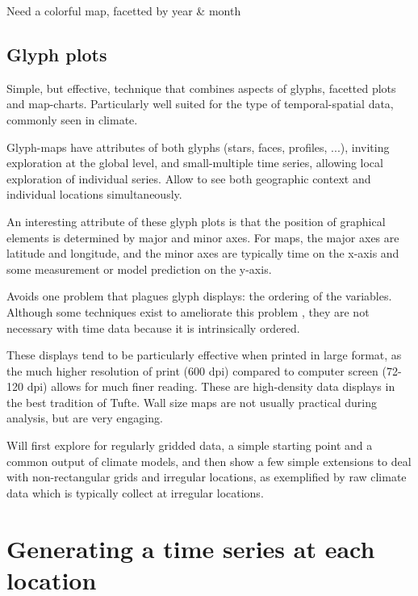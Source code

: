 \documentclass[oneside]{article}
\begin{document}
Need a colorful map, facetted by year \& month


\subsection{Glyph plots}

Simple, but effective, technique that combines aspects of glyphs, facetted plots and map-charts. Particularly well suited for the type of temporal-spatial data, commonly seen in climate.

Glyph-maps have attributes of both glyphs (stars, faces, profiles, ...), inviting exploration at the global level, and small-multiple time series, allowing local exploration of individual series. Allow to see both geographic context and individual locations simultaneously.

An interesting attribute of these glyph plots is that the position of graphical elements is determined by major and minor axes. For maps, the major axes are latitude and longitude, and the minor axes are typically time on the x-axis and some measurement or model prediction on the y-axis.

Avoids one problem that plagues glyph displays: the ordering of the variables. Although some techniques exist to ameliorate this problem \citep{kleiner:1981,hurley:2010}, they are not necessary with time data because it is intrinsically ordered.

These displays tend to be particularly effective when printed in large format, as the much higher resolution of print (600 dpi) compared to computer  screen (72-120 dpi) allows for much finer reading. These are high-density data displays in the best tradition of Tufte. Wall size maps are not usually practical during analysis, but are very engaging.

Will first explore for regularly gridded data, a simple starting point and a common output of climate models, and then show a few simple extensions to deal with non-rectangular grids and irregular locations, as exemplified by raw climate data which is typically collect at irregular locations.
\section{Generating a time series at each location}
\end{document}
